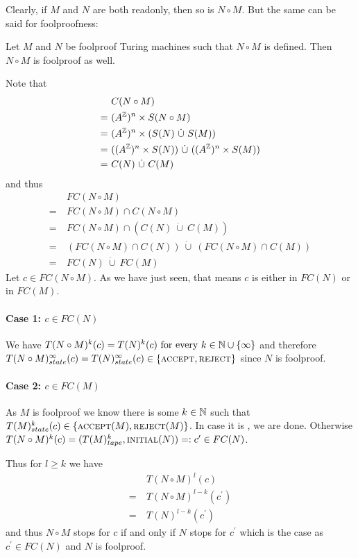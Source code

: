 Clearly, if $M$ and $N$ are both readonly, then so is $N \circ M$. But the same can be said for foolproofness:

\begin{Lemma} \label{turing_machines:lemma_foolproof_concatenation:lemma}
	Let $M$ and $N$ be foolproof Turing machines such that $N \circ M$ is defined. Then $N \circ M$ is foolproof as well.
\end{Lemma}
\proof
Note that
\begin{align*}
	&C(N \circ M) \\
	=~&(A^{\mathbb{Z}})^n \times S(N \circ M) \\
	=~&(A^{\mathbb{Z}})^n \times (S(N)~\dot\cup~S(M)) \\
	=~&((A^{\mathbb{Z}})^n \times S(N))~\dot\cup~((A^{\mathbb{Z}})^n \times S(M)) \\
	=~&C(N)~\dot\cup~C(M)
\end{align*}
and thus
\begin{align*}
	&FC(N \circ M) \\
	=~&FC(N \circ M) \cap C(N \circ M) \\
	=~&FC(N \circ M) \cap (C(N)~\dot\cup~C(M)) \\
	=~&(FC(N \circ M) \cap C(N))~\dot\cup~(FC(N \circ M) \cap C(M)) \\
	=~&FC(N)~\dot\cup~FC(M)
\end{align*}
Let $c \in FC(N \circ M)$. As we have just seen, that means $c$ is either in $FC(N)$ or in $FC(M)$.
\paragraph{Case 1: $c \in FC(N)$}
We have
$T(N \circ M)^k (c) = T(N)^k (c) ~\text{for every}~ k \in \mathbb{N} \cup \{\infty\}$
and therefore $T(N \circ M)_{state}^\infty(c) = T(N)_{state}^\infty(c) \in \{\text{\scshape{accept}},\text{\scshape{reject}}\}$
since $N$ is foolproof.
\paragraph{Case 2: $c \in FC(M)$}
As $M$ is foolproof we know there is some $k \in \mathbb{N}$ such that $T(M)_{state}^k(c) \in \{\text{\scshape{accept}}(M),\text{\scshape{reject}}(M)\}$.
In case it is \REJ, we are done.
Otherwise $T(N \circ M)^k(c) = (T(M)_{tape}^k,\text{\scshape{initial}}(N)) =: c^\prime \in FC(N)$.

Thus for $l \geq k$ we have
\begin{align*}
	&T(N \circ M)^l(c) \\
	=~&T(N \circ M)^{l-k}(c^\prime) \\
	=~&T(N)^{l-k}(c^\prime)
\end{align*}
and thus $N \circ M$ stops for $c$ if and only if $N$ stops for $c^\prime$ which is the case as $c^\prime \in FC(N)$ and $N$ is foolproof.
\endproof
